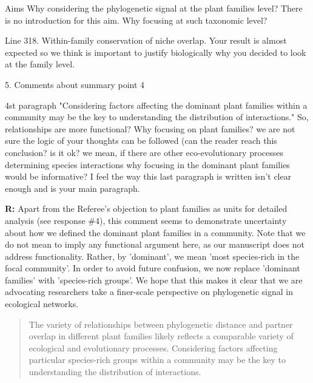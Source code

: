\documentclass[12pt]{letter}
\newenvironment{refquote}{\bigskip \begin{it}}{\end{it}\smallskip}
\begin{document}
		\begin{refquote}
		Aims
		Why considering the phylogenetic signal at the plant families level? There is no introduction for this aim. Why focusing at such taxonomic level?
		\end{refquote}


		\begin{refquote}
			Line 318. Within-family conservation of niche overlap. Your result is almost expected so we think is important to justify biologically why you decided to look at the family level.
		\end{refquote}


	5. Comments about summary point 4

		\begin{refquote}
		4st paragraph "Considering factors affecting the dominant plant families within
		a community may be the key to understanding the distribution of interactions." So, relationships are more functional? Why focusing on plant families? we are not sure the logic of your thoughts can be followed (can the reader reach this conclusion? is it ok? we mean, if there are other eco-evolutionary processes determining species interactions why focusing in the dominant plant families would be informative? I feel the way this last paragraph is written isn't clear enough and is your main paragraph.
		\end{refquote}


		\textbf{R:} Apart from the Referee's objection to plant families as units for detailed analysis (see response \#4), this comment seems to demonstrate uncertainty about how we defined the dominant plant families in a community. Note that we do not mean to imply any functional argument here, as our manuscript does not address functionality. Rather, by 'dominant', we mean 'most species-rich in the focal community'. In order to avoid future confusion, we now replace 'dominant families' with 'species-rich groups'. We hope that this makes it clear that we are advocating researchers take a finer-scale perspective on phylogenetic signal in ecological networks.


		\begin{quotation}
		    \item The variety of relationships between phylogenetic distance and partner overlap in different plant families likely reflects a comparable variety of ecological and evolutionary processes. Considering factors affecting particular species-rich groups within a community may be the key to understanding the distribution of interactions.
		\end{quotation}
\end{document}
